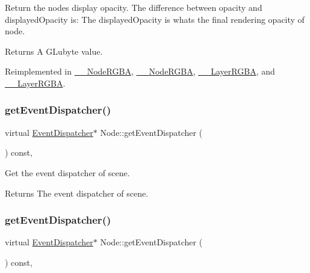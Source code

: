 Return the node\textquotesingle{}s display opacity. The difference between opacity and displayed\+Opacity is\+: The displayed\+Opacity is what\textquotesingle{}s the final rendering opacity of node. \begin{DoxyReturn}{Returns}
A G\+Lubyte value. 
\end{DoxyReturn}


Reimplemented in \hyperlink{class____NodeRGBA_adbf1aa17734836db2096f2901d81d304}{\+\_\+\+\_\+\+Node\+R\+G\+BA}, \hyperlink{class____NodeRGBA_adbf1aa17734836db2096f2901d81d304}{\+\_\+\+\_\+\+Node\+R\+G\+BA}, \hyperlink{class____LayerRGBA_a3c94f57397e6c53127d1176d14ab25fe}{\+\_\+\+\_\+\+Layer\+R\+G\+BA}, and \hyperlink{class____LayerRGBA_a3c94f57397e6c53127d1176d14ab25fe}{\+\_\+\+\_\+\+Layer\+R\+G\+BA}.

\mbox{\label{classNode_ae6ba7b287241f031b271d7d680f070f3}} 
\subsubsection{\texorpdfstring{get\+Event\+Dispatcher()}{getEventDispatcher()}\hspace{0.1cm}{\footnotesize\ttfamily [1/2]}}
{\footnotesize\ttfamily virtual \hyperlink{classEventDispatcher}{Event\+Dispatcher}$\ast$ Node\+::get\+Event\+Dispatcher (\begin{DoxyParamCaption}{ }\end{DoxyParamCaption}) const\hspace{0.3cm}{\ttfamily [inline]}, {\ttfamily [virtual]}}

Get the event dispatcher of scene.

\begin{DoxyReturn}{Returns}
The event dispatcher of scene. 
\end{DoxyReturn}
\mbox{\label{classNode_ae6ba7b287241f031b271d7d680f070f3}} 
\subsubsection{\texorpdfstring{get\+Event\+Dispatcher()}{getEventDispatcher()}\hspace{0.1cm}{\footnotesize\ttfamily [2/2]}}
{\footnotesize\ttfamily virtual \hyperlink{classEventDispatcher}{Event\+Dispatcher}$\ast$ Node\+::get\+Event\+Dispatcher (\begin{DoxyParamCaption}{ }\end{DoxyParamCaption}) const\hspace{0.3cm}{\ttfamily [inline]}, {\ttfamily [virtual]}}

